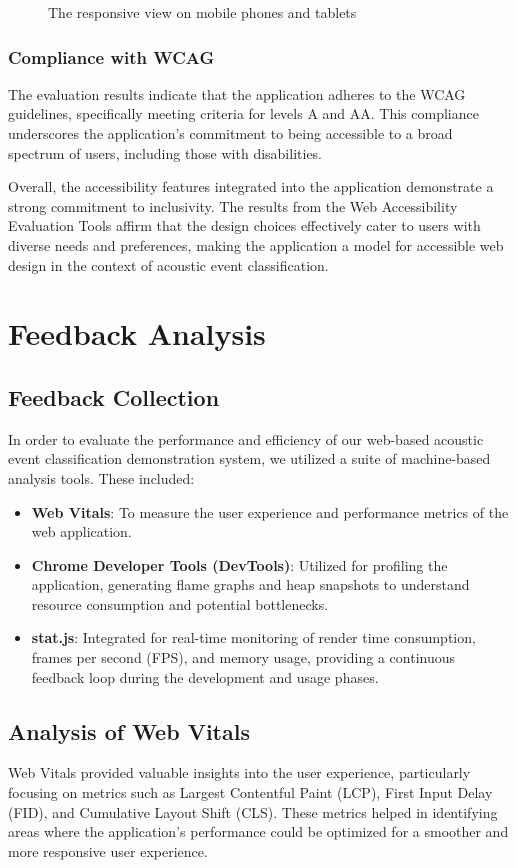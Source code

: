 \begin{figure}[!tbp]
  \caption{\label{fig:responsive}The responsive view on mobile phones and tablets}
\end{figure}

\subsubsection{Compliance with WCAG}
The evaluation results indicate that the application adheres to the WCAG guidelines, specifically meeting criteria for levels A and AA. This compliance underscores the application's commitment to being accessible to a broad spectrum of users, including those with disabilities.

Overall, the accessibility features integrated into the application demonstrate a strong commitment to inclusivity. The results from the Web Accessibility Evaluation Tools affirm that the design choices effectively cater to users with diverse needs and preferences, making the application a model for accessible web design in the context of acoustic event classification.

\section{Feedback Analysis}
\subsection{Feedback Collection}
In order to evaluate the performance and efficiency of our web-based acoustic event classification demonstration system, we utilized a suite of machine-based analysis tools. These included:

\begin{itemize}
  \item \textbf{Web Vitals}: To measure the user experience and performance metrics of the web application.
  \item \textbf{Chrome Developer Tools (DevTools)}: Utilized for profiling the application, generating flame graphs and heap snapshots to understand resource consumption and potential bottlenecks.
  \item \textbf{stat.js}: Integrated for real-time monitoring of render time consumption, frames per second (FPS), and memory usage, providing a continuous feedback loop during the development and usage phases.
\end{itemize}

\subsection{Analysis of Web Vitals}
Web Vitals provided valuable insights into the user experience, particularly focusing on metrics such as Largest Contentful Paint (LCP), First Input Delay (FID), and Cumulative Layout Shift (CLS). These metrics helped in identifying areas where the application's performance could be optimized for a smoother and more responsive user experience.

